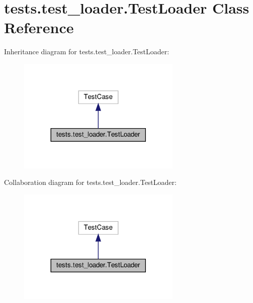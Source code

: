 \hypertarget{classtests_1_1test__loader_1_1TestLoader}{}\section{tests.\+test\+\_\+loader.\+Test\+Loader Class Reference}
\label{classtests_1_1test__loader_1_1TestLoader}


Inheritance diagram for tests.\+test\+\_\+loader.\+Test\+Loader\+:
\nopagebreak
\begin{figure}[H]
\begin{center}
\leavevmode
\includegraphics[width=221pt]{d0/d3f/classtests_1_1test__loader_1_1TestLoader__inherit__graph}
\end{center}
\end{figure}


Collaboration diagram for tests.\+test\+\_\+loader.\+Test\+Loader\+:
\nopagebreak
\begin{figure}[H]
\begin{center}
\leavevmode
\includegraphics[width=221pt]{d4/daf/classtests_1_1test__loader_1_1TestLoader__coll__graph}
\end{center}
\end{figure}
